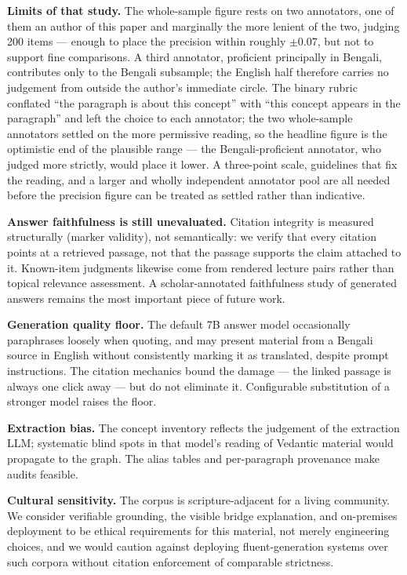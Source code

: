 \documentclass[11pt,a4paper]{article}
\begin{document}
\textbf{Limits of that study.} The whole-sample figure rests on two
annotators, one of them an author of this paper and marginally the more
lenient of the two, judging 200 items --- enough to place the precision
within roughly $\pm 0.07$, but not to support fine comparisons. A third
annotator, proficient principally in Bengali, contributes only to the
Bengali subsample; the English half therefore carries no judgement from
outside the author's immediate circle. The binary rubric conflated ``the
paragraph is about this concept'' with ``this concept appears in the
paragraph'' and left the choice to each annotator; the two whole-sample
annotators settled on the more permissive reading, so the headline figure
is the optimistic end of the plausible range --- the Bengali-proficient
annotator, who judged more strictly, would place it lower. A three-point
scale, guidelines that fix the reading, and a larger and wholly
independent annotator pool are all needed before the precision figure can
be treated as settled rather than indicative.

\textbf{Answer faithfulness is still unevaluated.} Citation integrity is
measured structurally (marker validity), not semantically: we verify that
every citation points at a retrieved passage, not that the passage
supports the claim attached to it. Known-item judgments likewise come
from rendered lecture pairs rather than topical relevance assessment. A
scholar-annotated faithfulness study of generated answers remains the
most important piece of future work.

\textbf{Generation quality floor.} The default 7B answer model
occasionally paraphrases loosely when quoting, and may present material
from a Bengali source in English without consistently marking it as
translated, despite prompt instructions. The citation mechanics bound
the damage --- the linked passage is always one click away --- but do not
eliminate it. Configurable substitution of a stronger model raises the
floor.

\textbf{Extraction bias.} The concept inventory reflects the judgement
of the extraction LLM; systematic blind spots in that model's reading of
Vedantic material would propagate to the graph. The alias tables and
per-paragraph provenance make audits feasible.

\textbf{Cultural sensitivity.} The corpus is scripture-adjacent for a
living community. We consider verifiable grounding, the visible bridge
explanation, and on-premises deployment to be ethical requirements for
this material, not merely engineering choices, and we would caution
against deploying fluent-generation systems over such corpora without
citation enforcement of comparable strictness.
\end{document}
